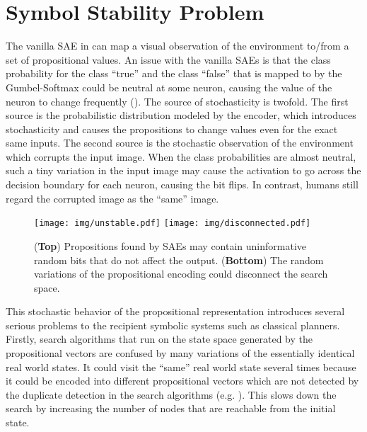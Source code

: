 
\section{Symbol Stability Problem}
\label{issues}

The vanilla SAE in \latentplanner can map a visual observation of the environment to/from a set of propositional values.
An issue with the vanilla SAEs is that the class probability for the class ``true'' and the class ``false''
that is mapped to by the Gumbel-Softmax could be neutral at some neuron,
causing the value of the neuron to change frequently ().
The source of stochasticity is twofold.
The first source is the probabilistic distribution modeled by the encoder,
which introduces stochasticity and causes the propositions to change values even for the exact same inputs.
The second source is the stochastic observation of the environment which corrupts the input image.
When the class probabilities are almost neutral,
such a tiny variation in the input image may cause the activation to go across the decision boundary for each neuron,
causing the bit flips.
In contrast, humans still regard the corrupted image as the ``same'' image.

\begin{figure}[tb]
 \centering
 \texttt{[image: img/unstable.pdf]}
 \texttt{[image: img/disconnected.pdf]}
 \caption{
(\textbf{Top}) Propositions found by SAEs may contain uninformative random bits
 that do not affect the output.
(\textbf{Bottom})
 The random variations of the propositional encoding could disconnect the search space.
}
 \label{unstable}
 \label{disconnected}
\end{figure}

This stochastic behavior of the propositional representation
introduces several serious problems to the recipient symbolic systems such as classical planners.
% 
Firstly,
search algorithms that run on the state space generated by the propositional vectors
are confused by many variations of the essentially identical real world states.
It could visit the ``same'' real world state several times because
it could be encoded into different propositional vectors
which are not detected by the duplicate detection in the search algorithms (e.g. \astar).
This slows down the search by increasing the number of nodes that are reachable from the initial state.


